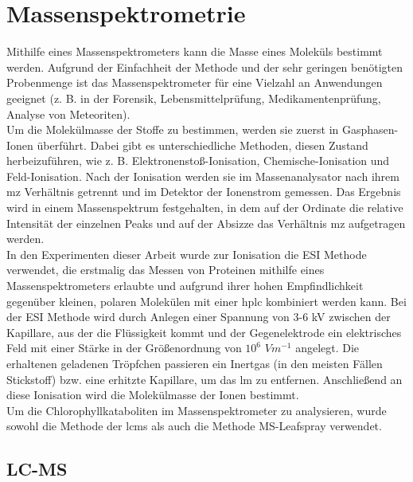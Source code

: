 \section{Massenspektrometrie}

Mithilfe eines Massenspektrometers kann die Masse eines Moleküls bestimmt werden. Aufgrund der Einfachheit der Methode und der sehr geringen benötigten Probenmenge ist das Massenspektrometer für eine Vielzahl an Anwendungen geeignet (z. B. in der Forensik, Lebensmittelprüfung, Medikamentenprüfung, Analyse von Meteoriten). \cite[S. 1]{MassSpectrometry} \\

Um die Molekülmasse der Stoffe zu bestimmen, werden sie zuerst in Gasphasen-Ionen überführt. \cite[S. 15]{MassSpectrometry} Dabei gibt es unterschiedliche Methoden, diesen Zustand herbeizuführen, wie z. B. Elektronenstoß-Ionisation, Chemische-Ionisation und Feld-Ionisation. \cite[S. 15-30]{MassSpectrometry} Nach der Ionisation werden sie im Massenanalysator nach ihrem \gls{mz} Verhältnis getrennt und im Detektor der Ionenstrom gemessen. Das Ergebnis wird in einem Massenspektrum festgehalten, in dem auf der Ordinate die relative Intensität der einzelnen Peaks und auf der Absizze das Verhältnis \gls{mz} aufgetragen werden. \\

In den Experimenten dieser Arbeit wurde zur Ionisation die \gls{ESI} Methode verwendet, die erstmalig das Messen von Proteinen mithilfe eines Massenspektrometers erlaubte und aufgrund ihrer hohen Empfindlichkeit gegenüber kleinen, polaren Molekülen mit einer \gls{hplc} kombiniert werden kann. Bei der \gls{ESI} Methode wird durch Anlegen einer Spannung von 3-6 kV zwischen der Kapillare, aus der die Flüssigkeit kommt und der Gegenelektrode ein elektrisches Feld mit einer Stärke in der Größenordnung von $10^{6}$ $Vm^{-1}$ angelegt. Die erhaltenen geladenen Tröpfchen passieren ein Inertgas (in den meisten Fällen Stickstoff) bzw. eine erhitzte Kapillare, um das \gls{lm} zu entfernen. Anschließend an diese Ionisation wird die Molekülmasse der Ionen bestimmt. \cite[S. 43-44]{MassSpectrometry} \\

Um die Chlorophyllkataboliten im Massenspektrometer zu analysieren, wurde sowohl die Methode der \gls{lcms} als auch die Methode MS-Leafspray verwendet. 

\subsection{LC-MS}

